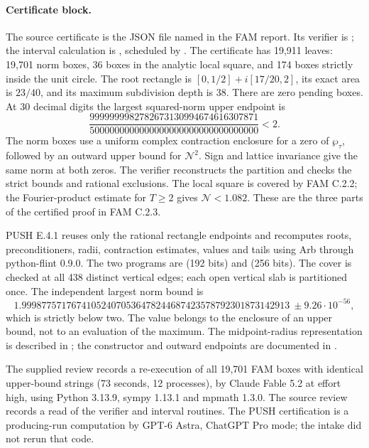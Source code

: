 \documentclass[11pt,a4paper]{article}
\theoremstyle{plain}
\theoremstyle{definition}
\begin{document}
\paragraph{Certificate block.}
The source certificate is the JSON file  named in the FAM report. Its verifier is ; the interval calculation is , scheduled by . The certificate has 19,911 leaves: 19,701 norm boxes, 36 boxes in the analytic local square, and 174 boxes strictly inside the unit circle. The root rectangle is $[0,1/2]+i[17/20,2]$, its exact area is $23/40$, and its maximum subdivision depth is 38. There are zero pending boxes. At 30 decimal digits the largest squared-norm upper endpoint is
\[
\frac{9999999982782673130994674616307871}
 {5000000000000000000000000000000000}<2.
\]
The norm boxes use a uniform complex contraction enclosure for a zero of $\wp_\tau$, followed by an outward upper bound for $\mathcal N^2$. Sign and lattice invariance give the same norm at both zeros. The verifier reconstructs the partition and checks the strict bounds and rational exclusions. The local square is covered by FAM C.2.2; the Fourier-product estimate for $T\ge2$ gives $\mathcal N<1.082$. These are the three parts of the certified proof in FAM C.2.3.

PUSH E.4.1 reuses only the rational rectangle endpoints and recomputes roots, preconditioners, radii, contraction estimates, values and tails using Arb through python-flint 0.9.0. The two programs are  (192 bits) and  (256 bits). The cover is checked at all 438 distinct vertical edges; each open vertical slab is partitioned once. The independent largest norm bound is
\[
1.999877571767410524070536478244687423578792301873142913
\ \pm9.26\cdot10^{-56},
\]
which is strictly below two. The value belongs to the enclosure of an upper bound, not to an evaluation of the maximum. The midpoint-radius representation is described in \cite[§§2--3]{Johansson2016}; the constructor and outward endpoints are documented in \cite[\texttt{arb}, \texttt{abs\_upper}, \texttt{upper}]{PythonFlint2026}.

The supplied review records a re-execution of all 19,701 FAM boxes with identical upper-bound strings (73 seconds, 12 processes), by Claude Fable 5.2 at effort high, using Python 3.13.9, sympy 1.13.1 and mpmath 1.3.0. The source review records a read of the verifier and interval routines. The PUSH certification is a producing-run computation by GPT-6 Astra, ChatGPT Pro mode; the intake did not rerun that code.
\end{document}
